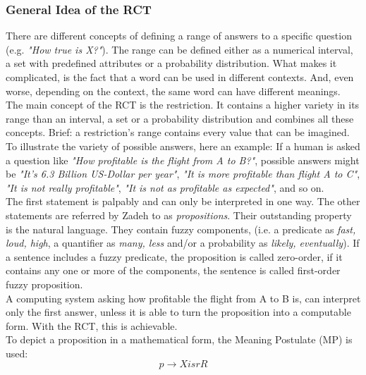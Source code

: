 \documentclass[conference]{IEEEtran}
\begin{document}
\subsubsection{General Idea of the RCT}
There are different concepts of defining a range of answers to a specific question (e.g. \emph{"How true is X?"}). The range can be defined either as a numerical interval, a set with predefined attributes or a probability distribution. What makes it complicated, is the fact that a word can be used in different contexts. And, even worse, depending on the context, the same word can have different meanings.\\
The main concept of the RCT is the restriction. It contains a higher variety in its range than an interval, a set or a probability distribution and combines all these concepts. Brief: a restriction's range contains every value that can be imagined. To illustrate the variety of possible answers, here an example: If a human is asked a question like \emph{"How profitable is the flight from A to B?"}, possible answers might be \emph{"It's 6.3 Billion US-Dollar per year"}, \emph{"It is more profitable than flight A to C"}, \emph{"It is not really profitable"}, \emph{"It is not as profitable as expected"}, and so on.\\
The first statement is palpably and can only be interpreted in one way. The other statements are referred by Zadeh \cite{zadeh2013} to as \emph{propositions}. Their outstanding property is the natural language. They contain fuzzy components, (i.e. a predicate as \emph{fast, loud, high}, a quantifier as \emph{many, less} and/or a probability as \emph{likely, eventually}). If a sentence includes a fuzzy predicate, the proposition is called zero-order, if it contains any one or more of the components, the sentence is called first-order fuzzy proposition.\\ 
A computing system asking how profitable the flight from A to B is, can interpret only the first answer, unless it is able to turn the proposition into a computable form. With the RCT, this is achievable.\\
To depict a proposition in a mathematical form, the Meaning Postulate (MP) is used:
\begin{equation} \label{eq:mp}
p \rightarrow X isr R
\end{equation}
\end{document}
